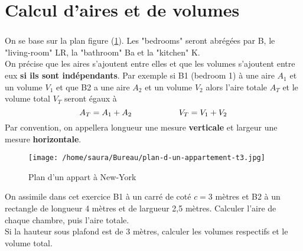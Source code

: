\documentclass[a4paper,10pt]{article}
\newcommand{\subsub}{\subsubsection}
\begin{document}

\pagebreak

\section{Calcul d'aires et de volumes}


\subsub{}
On se base sur la plan figure (\ref{appart}). Les "bedrooms" seront abrégées par B, le "living-room" LR, la "bathroom" Ba et la "kitchen" K. \\
On précise que les aires s'ajoutent entre elles et que les volumes s'ajoutent entre eux \textbf{si ils sont indépendants}. Par exemple si B1 (bedroom 1) à une aire $A_1$ et un volume $V_1$ et que B2 a une aire $A_2$ et un volume $V_2$ alors l'aire totale $A_T$ et le volume total $V_T$ seront égaux à
\begin{equation*}
A_T = A_1 + A_2 \text{\hspace{2 cm}} V_T = V_1 + V_2
\end{equation*}
Par convention, on appellera longueur une mesure \textbf{verticale} et largeur une mesure \textbf{horizontale}. 

\begin{figure}[!h]
\centering
\texttt{[image: /home/saura/Bureau/plan-d-un-appartement-t3.jpg]}
\caption{Plan d'un appart à New-York}
\label{appart}
\end{figure}

On assimile dans cet exercice B1 à un carré de coté $c = 3$ mètres et B2 à un rectangle de longueur 4 mètres et de largueur 2,5 mètres. Calculer l'aire de chaque chambre, puis l'aire totale. \\
Si la hauteur sous plafond est de 3 mètres, calculer les volumes respectifs et le volume total.
\end{document}
